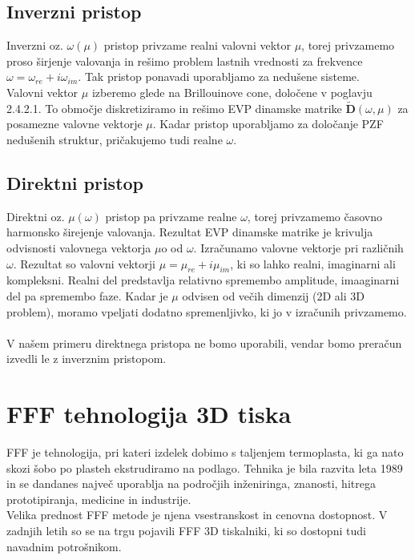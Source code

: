 \documentclass[12pt]{report}
\begin{document}
\subsection{Inverzni pristop}
Inverzni oz. $\omega(\mu)$ pristop privzame realni valovni vektor $\mu$, torej privzamemo proso širjenje valovanja in rešimo problem lastnih vrednosti za frekvence $\omega = \omega_{re} + i\omega_{im}$. Tak pristop ponavadi 
uporabljamo za nedušene sisteme. \cite{vanbelle} \\
Valovni vektor $\mu$ izberemo glede na Brillouinove cone, določene v poglavju 2.4.2.1. To območje diskretiziramo in rešimo \ac{EVP} dinamske matrike $\mathbf{\widetilde{D}}(\omega, \mu)$ za posamezne valovne vektorje $\mu$.
Kadar pristop uporabljamo za določanje \ac{PZF} nedušenih struktur, pričakujemo tudi realne $\omega$. \cite{kosir}

\subsection{Direktni pristop}
Direktni oz. $\mu(\omega)$ pristop pa privzame realne $\omega$, torej privzamemo časovno harmonsko širejenje valovanja. Rezultat \ac{EVP} dinamske matrike je krivulja odvisnosti valovnega vektorja $\mu$o
od $\omega$. Izračunamo valovne vektorje pri različnih $\omega$. Rezultat so valovni vektorji $\mu = \mu_{re} + i\mu_{im}$, ki so lahko realni, imaginarni ali kompleksni. Realni del predstavlja relativno spremembo amplitude, imaaginarni del pa
spremembo faze. \cite{vanbelle, kosir} Kadar je $\mu$ odvisen od večih dimenzij (2D ali 3D problem), moramo vpeljati dodatno spremenljivko, ki jo v izračunih privzamemo.
\\
\\
V našem primeru direktnega pristopa ne bomo uporabili, vendar bomo preračun izvedli le z inverznim pristopom.

\section{FFF tehnologija 3D tiska}
\ac{FFF} je tehnologija, pri kateri izdelek dobimo s taljenjem termoplasta, ki ga nato skozi šobo po plasteh ekstrudiramo na podlago. Tehnika je bila razvita leta 1989 in se dandanes
največ uporablja na področjih inženiringa, znanosti, hitrega prototipiranja, medicine in industrije. \cite{fff_article}
\\
Velika prednost \ac{FFF} metode je njena vsestranskost in cenovna dostopnost. V zadnjih letih so se na trgu pojavili \ac{FFF} 3D tiskalniki, ki so dostopni tudi 
navadnim potrošnikom. 
\end{document}
